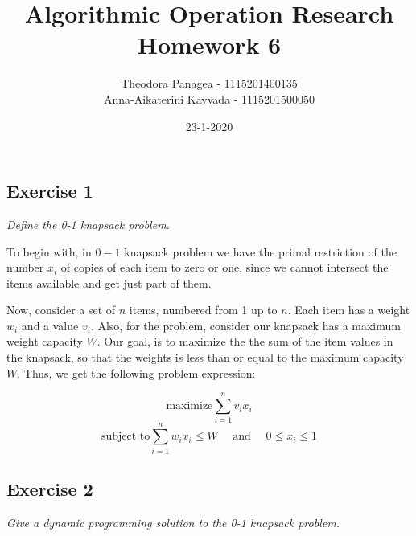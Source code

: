 \documentclass[12pt]{article}
\title{Algorithmic Operation Research \\ Homework 6}
\date{23-1-2020}
\author{Theodora Panagea - 1115201400135 \\ Anna-Aikaterini Kavvada - 1115201500050}
\begin{document}
	\maketitle{}
 
 \newpage
\subsection*{Exercise 1}
\textit{Define the 0-1 knapsack problem.}\newline

To begin with, in $0-1$ knapsack problem we have the primal restriction of the number $x_i$ of copies of each item to zero or one, since we cannot intersect the items available and get just part of them. \par
Now, consider a set of $n$ items, numbered from 1 up to $n$. Each item has a weight $w_i$ and a value $v_i$. Also, for the problem, consider our knapsack has a maximum weight capacity $W$. Our goal, is to maximize the the sum of the item values in the knapsack, so that the weights is less than or equal to the maximum capacity $W$. Thus, we get the following problem expression:

$$\text{maximize} \sum_{i=1}^{n} v_i x_i$$
$$\text{subject to} \sum_{i=1}^{n} w_i x_i \leq W \quad \text{ and } \quad 0 \leq x_i \leq 1$$

\newpage

\subsection*{Exercise 2}
\textit{Give a dynamic programming solution to the 0-1 knapsack problem.}\newline
\end{document}
